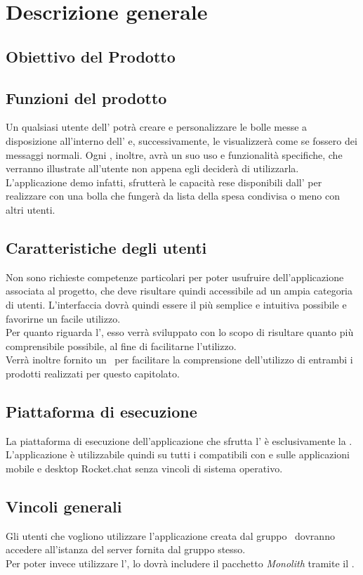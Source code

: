 \section{Descrizione generale}
\subsection{Obiettivo del Prodotto}
\scopoProdotto

\subsection{Funzioni del prodotto}
Un qualsiasi utente dell' potrà creare e personalizzare le bolle messe a disposizione all'interno dell' e, successivamente, le visualizzerà come se fossero dei messaggi normali. Ogni , inoltre, avrà un suo uso e funzionalità specifiche, che verranno illustrate all'utente non appena egli deciderà di utilizzarla. L'applicazione demo infatti, sfrutterà le capacità rese disponibili dall' per realizzare con una bolla che fungerà da lista della spesa condivisa o meno con altri utenti.

\subsection{Caratteristiche degli utenti}
Non sono richieste competenze particolari per poter usufruire dell'applicazione associata al progetto, che deve risultare quindi accessibile ad un ampia categoria di utenti. L'interfaccia dovrà quindi essere il più semplice e intuitiva possibile e favorirne un facile utilizzo. \\
Per quanto riguarda l', esso verrà sviluppato con lo scopo di risultare quanto più comprensibile possibile, al fine di facilitarne l'utilizzo. \\
Verrà inoltre fornito un \MU\ per facilitare la comprensione dell'utilizzo di entrambi i prodotti realizzati per questo capitolato.

\subsection{Piattaforma di esecuzione} 
La piattaforma di esecuzione dell'applicazione che sfrutta l' è esclusivamente la  . L'applicazione è utilizzabile quindi su tutti i  compatibili con  e sulle applicazioni mobile e desktop Rocket.chat senza vincoli di sistema operativo.

\subsection{Vincoli generali}
Gli utenti che vogliono utilizzare l'applicazione creata dal gruppo \gruppo\ dovranno accedere all'istanza del server fornita dal gruppo stesso. \\
Per poter invece utilizzare l', lo  dovrà includere il pacchetto \textit{Monolith} tramite il  . 

\newpage